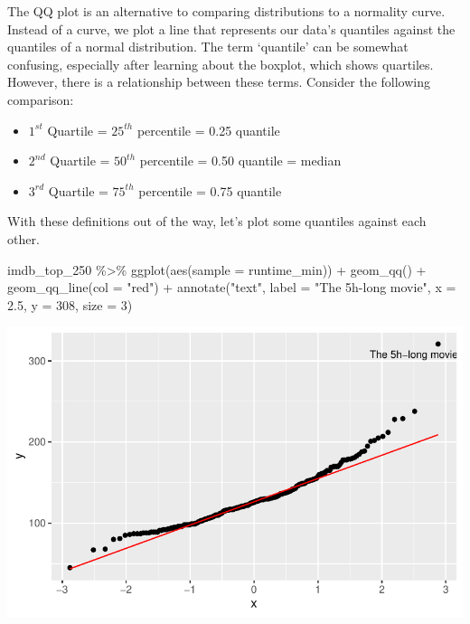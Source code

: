 \documentclass[
  letterpaper,
]{krantz}
\makeatletter
\newenvironment{Shaded}{\begin{snugshade}}{\end{snugshade}}
\newcommand{\AttributeTok}[1]{\textcolor[rgb]{0.40,0.45,0.13}{#1}}
\newcommand{\DecValTok}[1]{\textcolor[rgb]{0.68,0.00,0.00}{#1}}
\newcommand{\FloatTok}[1]{\textcolor[rgb]{0.68,0.00,0.00}{#1}}
\newcommand{\FunctionTok}[1]{\textcolor[rgb]{0.28,0.35,0.67}{#1}}
\newcommand{\NormalTok}[1]{\textcolor[rgb]{0.00,0.23,0.31}{#1}}
\newcommand{\SpecialCharTok}[1]{\textcolor[rgb]{0.37,0.37,0.37}{#1}}
\newcommand{\StringTok}[1]{\textcolor[rgb]{0.13,0.47,0.30}{#1}}
\newenvironment{kframe}{%
\medskip{}
\setlength{\fboxsep}{.8em}
 \def\at@end@of@kframe{}%
 \ifinner\ifhmode%
  \def\at@end@of@kframe{\end{minipage}}%
  \begin{minipage}{\columnwidth}%
 \fi\fi%
 \def\FrameCommand##1{\hskip\@totalleftmargin \hskip-\fboxsep
 \colorbox{shadecolor}{##1}\hskip-\fboxsep
     \hskip-\linewidth \hskip-\@totalleftmargin \hskip\columnwidth}%
 \MakeFramed {\advance\hsize-\width
   \@totalleftmargin\z@ \linewidth\hsize
   \@setminipage}}%
 {\par\unskip\endMakeFramed%
 \at@end@of@kframe}
\renewenvironment{Shaded}{\begin{kframe}}{\end{kframe}}
\makeatother
\begin{document}
The QQ plot is an alternative to comparing distributions to a normality
curve. Instead of a curve, we plot a line that represents our data's
quantiles against the quantiles of a normal distribution. The term
`quantile' can be somewhat confusing, especially after learning about
the boxplot, which shows quartiles. However, there is a relationship
between these terms. Consider the following comparison:

\begin{itemize}
\item
  \(1^{st}\) Quartile = \(25^{th}\) percentile = 0.25 quantile
\item
  \(2^{nd}\) Quartile = \(50^{th}\) percentile = 0.50 quantile = median
\item
  \(3^{rd}\) Quartile = \(75^{th}\) percentile = 0.75 quantile
\end{itemize}

With these definitions out of the way, let's plot some quantiles against
each other.

\begin{Shaded}
\begin{Highlighting}[]
\NormalTok{imdb\_top\_250 }\SpecialCharTok{\%\textgreater{}\%}
  \FunctionTok{ggplot}\NormalTok{(}\FunctionTok{aes}\NormalTok{(}\AttributeTok{sample =}\NormalTok{ runtime\_min)) }\SpecialCharTok{+}
  \FunctionTok{geom\_qq}\NormalTok{() }\SpecialCharTok{+}
  \FunctionTok{geom\_qq\_line}\NormalTok{(}\AttributeTok{col =} \StringTok{"red"}\NormalTok{) }\SpecialCharTok{+}
  \FunctionTok{annotate}\NormalTok{(}\StringTok{"text"}\NormalTok{,}
           \AttributeTok{label =} \StringTok{"The 5h{-}long movie"}\NormalTok{,}
           \AttributeTok{x =} \FloatTok{2.5}\NormalTok{,}
           \AttributeTok{y =} \DecValTok{308}\NormalTok{,}
           \AttributeTok{size =} \DecValTok{3}\NormalTok{)}
\end{Highlighting}
\end{Shaded}

\includegraphics{08_descriptive_statistics_files/figure-pdf/qq-plot-1.pdf}
\end{document}
